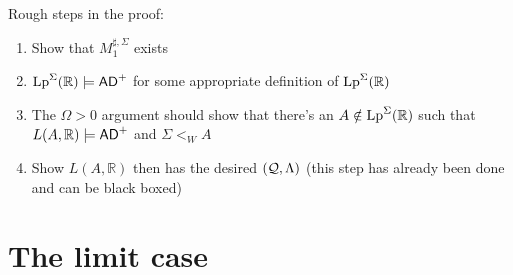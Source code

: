\documentclass[../main]{subfiles}
\begin{document}

Rough steps in the proof:
\begin{enumerate}
  \item Show that $M_1^{\sharp,\Sigma}$ exists
  \item $\operatorname{Lp}^\Sigma(\mathbb R)\models\textsf{AD}^+$ for some appropriate
    definition of $\operatorname{Lp}^\Sigma(\mathbb R)$
  \item The $\Omega>0$ argument should show that there's an
    $A\notin\operatorname{Lp}^\Sigma(\mathbb R)$ such that
    $L(A,\mathbb R)\models\textsf{AD}^+$ and $\Sigma <_W A$
  \item Show $L(A,\mathbb R)$ then has the desired $(\operatorname{\mathcal Q},\Lambda)$
    (this step has already been done and can be black boxed)
\end{enumerate}

\section{The limit case}

\end{document}
